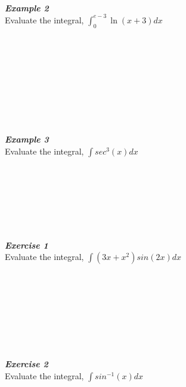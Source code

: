 \documentclass[12px]{article}
\begin{document}
\begin{enumerate}
\begin{multicols}{2}
        \\
        \\
        \\
        \\
        \\
        \\
        \\
        \\
        \textit{\textbf{Example 2}}\\
        Evaluate the integral, $\int_0^{e-3}\ln(x+3)dx$\\
        \\
        \\
        \\
        \\
        \\
        \\
        \\
        \\
        \\
        \textit{\textbf{Example 3}}\\
        Evaluate the integral, $\int sec^3(x)dx$\\
        \\
        \\
        \\
        \\
        \\
        \\
        \\
        \textit{\textbf{Exercise 1}}\\
        Evaluate the integral, $\int(3x+x^2)sin(2x)dx$\\
        \\
        \\
        \\
        \\
        \\
        \\
        \\
        \\
        \textit{\textbf{Exercise 2}}\\
        Evaluate the integral, $\int sin^{-1}(x)dx$\\
        \\
        \\
        \\
        \\
        \\
        \\

\end{multicols}
\end{enumerate}
\end{document}
